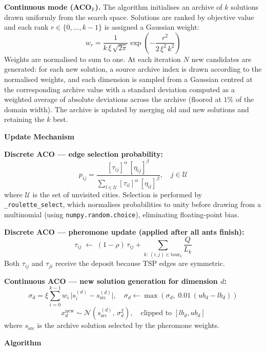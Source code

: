 \textbf{Continuous mode (ACO$_\mathbb{R}$).}
The algorithm initialises an archive of $k$ solutions drawn uniformly from the search space.
Solutions are ranked by objective value and each rank $r \in \{0,\ldots,k-1\}$ is assigned a
Gaussian weight:
\[
w_r = \frac{1}{k\,\xi\,\sqrt{2\pi}}\exp\!\left(-\frac{r^2}{2\,\xi^2\,k^2}\right)
\]
Weights are normalised to sum to one. At each iteration $N$ new candidates are generated: for
each new solution, a source archive index is drawn according to the normalised weights, and
each dimension is sampled from a Gaussian centred at the corresponding archive value with a
standard deviation computed as a weighted average of absolute deviations across the archive
(floored at $1\%$ of the domain width). The archive is updated by merging old and new
solutions and retaining the $k$ best.

\textbf{Update Mechanism}

\textbf{Discrete ACO --- edge selection probability:}
\[
p_{ij} = \frac{[\tau_{ij}]^\alpha\,[\eta_{ij}]^\beta}
              {\displaystyle\sum_{l\in\mathcal{U}}[\tau_{il}]^\alpha\,[\eta_{il}]^\beta},
\quad j\in\mathcal{U}
\]
where $\mathcal{U}$ is the set of unvisited cities. Selection is performed by
\texttt{\_roulette\_select}, which normalises probabilities to unity before drawing from a
multinomial (using \texttt{numpy.random.choice}), eliminating floating-point bias.

\textbf{Discrete ACO --- pheromone update (applied after all ants finish):}
\[
\tau_{ij} \;\leftarrow\; (1-\rho)\,\tau_{ij}
         + \sum_{k:\,(i,j)\in\text{tour}_k} \frac{Q}{L_k}
\]
Both $\tau_{ij}$ and $\tau_{ji}$ receive the deposit because TSP edges are symmetric.

\textbf{Continuous ACO --- new solution generation for dimension $d$:}
\[
\sigma_d = \xi\sum_{i=0}^{k-1} w_i\,\bigl|s_i^{(d)} - s_{\text{src}}^{(d)}\bigr|,
\quad \sigma_d \leftarrow \max\!\left(\sigma_d,\; 0.01\,(ub_d - lb_d)\right)
\]
\[
x_d^{\text{new}} \sim \mathcal{N}\!\left(s_{\text{src}}^{(d)},\,\sigma_d^2\right),
\quad \text{clipped to } [lb_d, ub_d]
\]
where $s_{\text{src}}$ is the archive solution selected by the pheromone weights.

\textbf{Algorithm}

